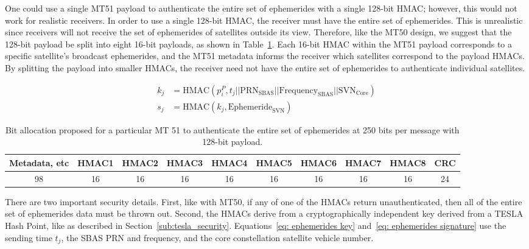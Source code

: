 \documentclass[APA,STIX1COL]{IONjournal/ION-APA Template}
\begin{document}
		One could use a single MT51 payload to authenticate the entire set of ephemerides with a single 128-bit HMAC; however, this would not work for realistic receivers.
		In order to use a single 128-bit HMAC, the receiver must have the entire set of ephemerides.
		This is unrealistic since receivers will not receive the set of ephemerides of satellites outside its view.
		Therefore, like the MT50 design, we suggest that the 128-bit payload be split into eight 16-bit payloads, as shown in Table~\ref{tab: nma}.
		Each 16-bit HMAC within the MT51 payload corresponds to a specific satellite's broadcast ephemerides, and the MT51 metadata informs the receiver which satellites correspond to the payload HMACs.
		By splitting the payload into smaller HMACs, the receiver need not have the entire set of ephemerides to authenticate individual satellites.

		\begin{align}
			k_j &= \textrm{HMAC}(p^P_i, t_j || \textrm{PRN}_\textrm{SBAS} || \textrm{Frequency}_\textrm{SBAS} || \textrm{SVN}_\textrm{Core} \label{eq: ephemerides key}) \\
			s_j &= \textrm{HMAC}(k_j, \textrm{Ephemeride}_{\textrm{SVN}}) \label{eq: ephemerides signature}
		\end{align}

		\begin{table}
			\center
			\begin{tabular}{|c|c|c|c|c|c|c|c|c|c|} \hline
				Metadata, etc & HMAC1 & HMAC2 & HMAC3 & HMAC4 & HMAC5 & HMAC6 & HMAC7 & HMAC8 & CRC \\ \hline
				98 & 16 & 16 & 16 & 16& 16 & 16 & 16 & 16 & 24 \\ \hline
			\end{tabular}
			\caption{Bit allocation proposed for a particular MT 51 to authenticate the entire set of ephemerides at 250 bits per message with 128-bit payload.}
			\label{tab: nma}
		\end{table}

		There are two important security details.
		First, like with MT50, if any of one of the HMACs return unauthenticated, then all of the entire set of ephemerides data must be thrown out.
		Second, the HMACs derive from a cryptographically independent key derived from a TESLA Hash Point, like as described in Section~\ref{sub:tesla_security}.
		Equations~\eqref{eq: ephemerides key} and~\eqref{eq: ephemerides signature} use the sending time $t_j$, the SBAS PRN and frequency, and the core constellation satellite vehicle number.
\end{document}
